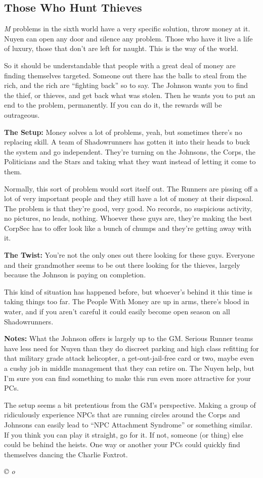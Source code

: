 \documentclass[letterpaper,onecolumn,10pt]{article}
\renewcommand{\textsc}[1]{{\fontspec{Friz Quadrata SC TT}\selectfont #1}}
\newcommand{\getyear}[1]{\StrLeft{#1}{4}}
\newenvironment{scenario}[6]
	{
		\section[#1 {\small\textsc{[#2]}}]{#1} \nopagebreak

		\noindent{\textsc{#2}}\nopagebreak

		\noindent\textit{#3}\nopagebreak
		\def\TMPSCENARIO{{\small\textit{©\getyear{#5}{} #4}}}
	}
	{\TMPSCENARIO}
\newcommand{\sectionlabel}[1]{\textbf{#1: }}
\newcommand{\synopsis}{\sectionlabel{Synopsis}}
\newcommand{\notes}{\sectionlabel{Notes}}
\newcommand{\twist}{\sectionlabel{The Twist}}
\begin{document}
\begin{multicols}{2}
\begin{scenario}{Those Who Hunt Thieves}
\synopsis 
Most problems in the sixth world have a very specific solution, throw money at it. Nuyen can open any door and silence any problem. Those who have it live a life of luxury, those that don't are left for naught. This is the way of the world.

So it should be understandable that people with a great deal of money are finding themselves targeted. Someone out there has the balls to steal from the rich, and the rich are ``fighting back'' so to say. The Johnson wants you to find the thief, or thieves, and get back what was stolen. Then he wants you to put an end to the problem, permanently. If you can do it, the rewards will be outrageous.

\sectionlabel{The Setup} Money solves a lot of problems, yeah, but sometimes there's no replacing skill. A team of Shadowrunners has gotten it into their heads to buck the system and go independent. They're turning on the Johnsons, the Corps, the Politicians and the Stars and taking what they want instead of letting it come to them.

Normally, this sort of problem would sort itself out. The Runners are pissing off a lot of very important people and they still have a lot of money at their disposal. The problem is that they're good, very good. No records, no suspicious activity, no pictures, no leads, nothing. Whoever these guys are, they're making the best CorpSec has to offer look like a bunch of chumps and they're getting away with it.

\twist You're not the only ones out there looking for these guys. Everyone and their grandmother seems to be out there looking for the thieves, largely because the Johnson is paying on completion.

This kind of situation has happened before, but whoever's behind it this time is taking things too far. The People With Money are up in arms, there's blood in water, and if you aren't careful it could easily become open season on all Shadowrunners.

\notes
What the Johnson offers is largely up to the GM. Serious Runner teams have less need for Nuyen than they do discreet parking and high class refitting for that military grade attack helicopter, a get-out-jail-free card or two, maybe even a cushy job in middle management that they can retire on. The Nuyen help, but I'm sure you can find something to make this run even more attractive for your PCs.

The setup seems a bit pretentious from the GM's perspective. Making a group of ridiculously experience NPCs that are running circles around the Corps and Johnsons can easily lead to ``NPC Attachment Syndrome'' or something similar. If you think you can play it straight, go for it. If not, someone (or thing) else could be behind the heists. One way or another your PCs could quickly find themselves dancing the Charlie Foxtrot.


\end{scenario}
\end{multicols}
\end{document}
